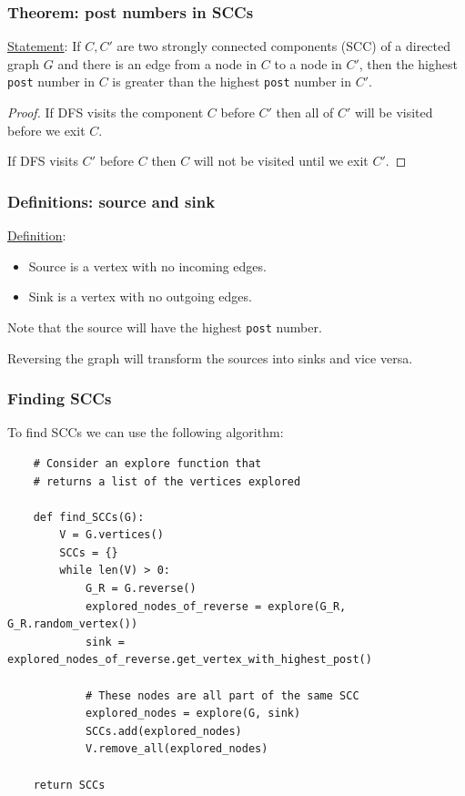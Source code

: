 \documentclass[10pt]{extarticle}
\begin{document}
\subsubsection{Theorem: post numbers in SCCs}

\underline{Statement}: If $C, C'$ are two strongly connected components (SCC) of a directed graph $G$ and there is an edge from a node in $C$ to a node in $C'$, then the highest \texttt{post} number in $C$ is greater than the highest \texttt{post} number in $C'$.

\begin{proof}
    If DFS visits the component $C$ before $C'$ then all of $C'$ will be visited before we exit $C$.

    If DFS visits $C'$ before $C$ then $C$ will not be visited until we exit $C'$.
\end{proof}

\subsubsection{Definitions: source and sink}

\underline{Definition}:
\begin{itemize}
    \item Source is a vertex with no incoming edges.
    \item Sink is a vertex with no outgoing edges.
\end{itemize}

Note that the source will have the highest \texttt{post} number.

Reversing the graph will transform the sources into sinks and vice versa.

\subsubsection{Finding SCCs}

To find SCCs we can use the following algorithm:

\begin{verbatim}
    # Consider an explore function that
    # returns a list of the vertices explored

    def find_SCCs(G):
        V = G.vertices()
        SCCs = {}
        while len(V) > 0:
            G_R = G.reverse()
            explored_nodes_of_reverse = explore(G_R, G_R.random_vertex())
            sink = explored_nodes_of_reverse.get_vertex_with_highest_post()

            # These nodes are all part of the same SCC
            explored_nodes = explore(G, sink)
            SCCs.add(explored_nodes)
            V.remove_all(explored_nodes)

    return SCCs
\end{verbatim}
\end{document}
